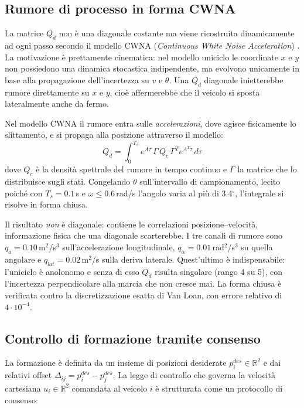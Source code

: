 \documentclass[conference,9pt]{IEEEtran}
\begin{document}
\subsection{Rumore di processo in forma CWNA}
\label{sub:cwna}

La matrice $Q_d$ non \`e una diagonale costante ma viene ricostruita
dinamicamente ad ogni passo secondo il modello CWNA (\emph{Continuous White
Noise Acceleration}) \cite{barshalom2001}. La motivazione \`e prettamente
cinematica: nel modello uniciclo le coordinate $x$ e $y$ non possiedono una
dinamica stocastica indipendente, ma evolvono unicamente in base alla
propagazione dell'incertezza su $v$ e $\theta$. Una $Q_d$ diagonale
inietterebbe rumore direttamente su $x$ e $y$, cio\`e affermerebbe che il
veicolo si sposta lateralmente anche da fermo.

Nel modello CWNA il rumore entra sulle \emph{accelerazioni}, dove agisce
fisicamente lo slittamento, e si propaga alla posizione attraverso il modello:
\begin{equation}
Q_d = \int_0^{T_s} e^{A\tau}\,\Gamma\,Q_c\,\Gamma^T e^{A^T\tau}\,d\tau
\label{eq:cwna}
\end{equation}
dove $Q_c$ \`e la densit\`a spettrale del rumore in tempo continuo e $\Gamma$ la
matrice che lo distribuisce sugli stati. Congelando $\theta$ sull'intervallo di
campionamento, lecito poich\'e con $T_s = 0.1$\,s e $\omega \leq 0.6$\,rad/s
l'angolo varia al pi\`u di 3.4$^\circ$, l'integrale si risolve in forma chiusa.

Il risultato \emph{non} \`e diagonale: contiene le correlazioni
posizione--velocit\`a, informazione fisica che una diagonale scarterebbe. I tre
canali di rumore sono $q_a = 0.10$\,m$^2$/s$^3$ sull'accelerazione
longitudinale, $q_\alpha = 0.01$\,rad$^2$/s$^3$ su quella angolare e
$q_{lat} = 0.02$\,m$^2$/s sulla deriva laterale. Quest'ultimo \`e
indispensabile: l'uniciclo \`e anolonomo e senza di esso $Q_d$ risulta singolare
(rango 4 su 5), con l'incertezza perpendicolare alla marcia che non cresce mai.
La forma chiusa \`e verificata contro la discretizzazione esatta di Van Loan,
con errore relativo di $4\cdot10^{-4}$.

\subsection{Controllo di formazione tramite consenso}
\label{sub:consenso}

La formazione \`e definita da un insieme di posizioni desiderate
$p_i^{des} \in \mathbb{R}^2$ e dai relativi offset
$\Delta_{ij} = p_i^{des} - p_j^{des}$. La legge di controllo che governa la
velocit\`a cartesiana $u_i \in \mathbb{R}^2$ comandata al veicolo $i$ \`e
strutturata come un protocollo di consenso:
\end{document}
